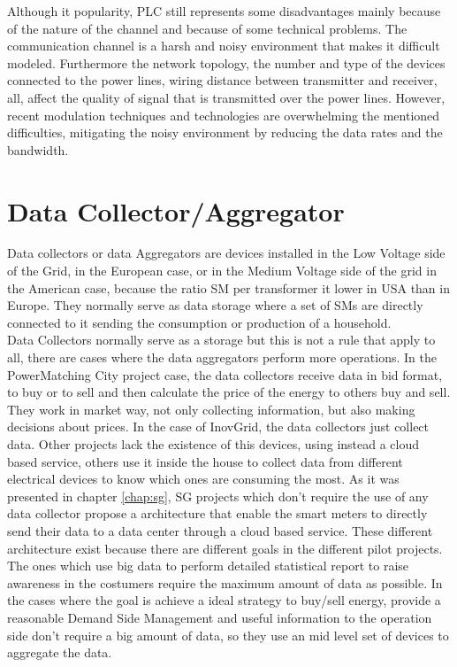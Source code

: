 Although it popularity, PLC still represents some disadvantages mainly because of the nature of the channel and because of some technical problems. The communication channel is a harsh and noisy environment that makes it difficult modeled. Furthermore the network topology, the number and type of the devices connected to the power lines, wiring distance between transmitter and receiver, all, affect the quality of signal that is transmitted over the power lines. However, recent modulation techniques and technologies are overwhelming the mentioned difficulties, mitigating the noisy environment by reducing the data rates and the bandwidth.\\ 



\section{Data Collector/Aggregator}
Data collectors or data Aggregators are devices installed in the Low Voltage side of the Grid, in the European case, or in the Medium Voltage side of the grid in the American case, because the ratio SM per transformer it lower in USA than in Europe. They normally serve as data storage where a set of SMs are directly connected to it sending the consumption or production of a household.\\
Data Collectors normally serve as a storage but this is not a rule that apply to all, there are cases where the data aggregators perform more operations. In the PowerMatching City project case, the data collectors receive data in bid format, to buy or to sell and then calculate the price of the energy to  others buy and sell. They work in market way, not only collecting information, but also making decisions about prices. In the case of InovGrid, the data collectors just collect data. Other projects lack the existence of this devices, using instead a cloud based service, others use it inside the house to collect data from different electrical devices to know which ones are consuming the most. As it was presented in chapter \ref{chap:sg},  SG projects which don't require the use of any data collector propose a architecture that enable the smart meters to directly send their data to a data center through a cloud based service. These different architecture exist because there are different goals in the different pilot projects. The ones which use big data to perform detailed statistical report to raise awareness in the costumers require the maximum amount of data as possible. In the cases where the goal is achieve a ideal strategy to buy/sell energy, provide a reasonable Demand Side Management and useful information to the operation side don't require a big amount of data, so they use an mid level set of devices to aggregate the data. \\

